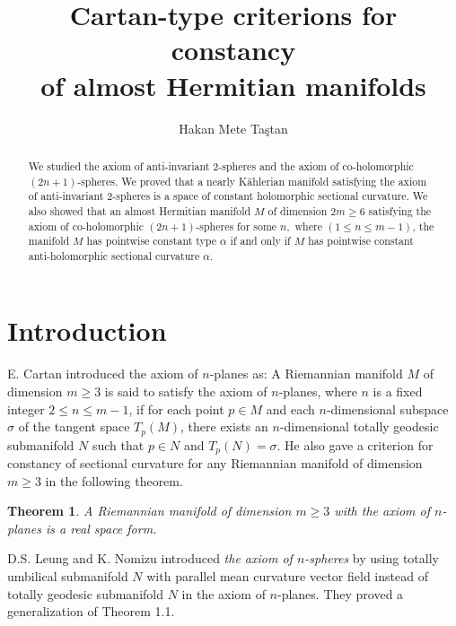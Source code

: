 \documentclass{amsart}
\newtheorem{theorem}{Theorem}[section]
\newtheorem*{theorem A}{Theorem A}
\newtheorem*{theorem B}{N\"olker's Theorem}
\theoremstyle{remark}
\theoremstyle{remark}
\theoremstyle{definition}
\numberwithin{equation}{section}
\begin{document}


\vspace{2cm}

\title{Cartan-type criterions for constancy \\ of almost Hermitian manifolds}

\author{Hakan Mete Ta\c stan}
\address{Department of Mathematics, \.Istanbul University, Vezneciler, 34134, \.Istanbul, TURKEY}




\begin{abstract}
We studied the axiom of anti-invariant 2-spheres and the axiom of
co-holomorphic $(2n+1)$-spheres. We proved that a nearly
K\"{a}hlerian manifold satisfying the axiom of anti-invariant
2-spheres is a space of constant holomorphic sectional curvature. We
also showed that an almost Hermitian manifold $M$ of dimension
$2m\geq6$ satisfying the axiom of co-holomorphic $(2n+1)$-spheres
for some $n,$  where $(1\leq n\leq m-1)$, the manifold $M$ has
pointwise constant type $\alpha$ if and only if $M$ has pointwise
constant anti-holomorphic sectional curvature $\alpha$.
\end{abstract}
\maketitle
\section{Introduction}
E. Cartan \cite{Car} introduced the axiom of $n$-planes as: A
Riemannian manifold $M$ of dimension $m\geq3$ is said to satisfy the
axiom of $n$-planes, where $n$ is a fixed integer $2\leq n\leq m-1$,
if for each point $p\in M$ and each $n$-dimensional subspace
$\sigma$ of the tangent space $T_p(M)$, there exists an
$n$-dimensional totally geodesic submanifold $N$ such that $p\in N$
and $T_p(N)=\sigma.$ He also gave a criterion for constancy of
sectional curvature for any Riemannian manifold of dimension
$m\geq3$ in the following theorem.
\begin{theorem} A Riemannian manifold of dimension $m\geq3$ with the axiom of $n$-planes is a real space form.
\end{theorem}
D.S. Leung and K. Nomizu \cite{Leu} introduced \emph{the axiom of
$n$-spheres} by using totally umbilical submanifold $N$ with
parallel mean curvature vector field instead of
totally geodesic submanifold $N$ in the axiom of $n$-planes. They proved a generalization of Theorem 1.1.\\
\end{document}
